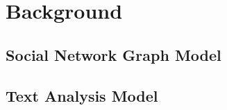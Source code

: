 \section{Background \label{sec:background}}

\subsection{Social Network Graph Model \label{sec:graph-background}}



\subsection{Text Analysis Model \label{sec:text-background}}




